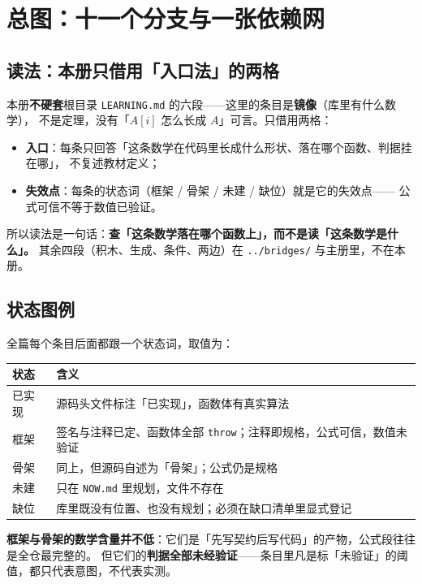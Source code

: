 \section{总图：十一个分支与一张依赖网}

\subsection{读法：本册只借用「入口法」的两格}

本册\textbf{不硬套}根目录 \texttt{LEARNING.md} 的六段——这里的条目是\textbf{镜像}（库里有什么数学），
不是定理，没有「$A[i]$ 怎么长成 $A$」可言。只借用两格：

\begin{itemize}
  \item \textbf{入口}：每条只回答「这条数学在代码里长成什么形状、落在哪个函数、判据挂在哪」，
        不复述教材定义；
  \item \textbf{失效点}：每条的状态词（框架 / 骨架 / 未建 / 缺位）就是它的失效点——
        公式可信不等于数值已验证。
\end{itemize}

所以读法是一句话：\textbf{查「这条数学落在哪个函数上」，而不是读「这条数学是什么」。}
其余四段（积木、生成、条件、两边）在 \texttt{../bridges/} 与主册里，不在本册。

\subsection{状态图例}

全篇每个条目后面都跟一个状态词，取值为：

\begin{center}
\begin{tabular}{L{2.6cm}L{12.4cm}}
\toprule
状态 & 含义 \\
\midrule
已实现 & 源码头文件标注「已实现」，函数体有真实算法 \\
框架 & 签名与注释已定、函数体全部 \texttt{throw}；注释即规格，公式可信，数值未验证 \\
骨架 & 同上，但源码自述为「骨架」；公式仍是规格 \\
未建 & 只在 \texttt{NOW.md} 里规划，文件不存在 \\
缺位 & 库里既没有位置、也没有规划；必须在缺口清单里显式登记 \\
\bottomrule
\end{tabular}
\end{center}

\textbf{框架与骨架的数学含量并不低}：它们是「先写契约后写代码」的产物，公式段往往是全仓最完整的。
但它们的\textbf{判据全部未经验证}——条目里凡是标「未验证」的阈值，都只代表意图，不代表实测。

